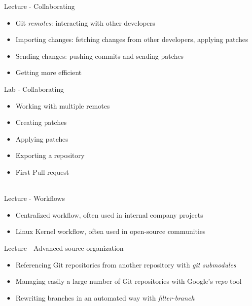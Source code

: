 \documentclass[a4paper,12pt,obeyspaces,spaces,hyphens]{article}
\begin{document}
\feagendatwocolumn
{Lecture - Collaborating}
{
  \begin{itemize}
  \item Git {\em remotes}: interacting with other developers
  \item Importing changes: fetching changes from other developers, applying patches
  \item Sending changes: pushing commits and sending patches
  \item Getting more efficient
  \end{itemize}
}
{Lab - Collaborating}
{
  \begin{itemize}
  \item Working with multiple remotes
  \item Creating patches
  \item Applying patches
  \item Exporting a repository
  \item First Pull request
  \end{itemize}
}
\\
\feagendatwocolumn
{Lecture - Workflows}
{
  \begin{itemize}
  \item Centralized workflow, often used in internal company projects
  \item Linux Kernel workflow, often used in open-source communities
  \end{itemize}
}
{Lecture - Advanced source organization}
{
  \begin{itemize}
  \item Referencing Git repositories from another repository with {\em git submodules}
  \item Managing easily a large number of Git repositories with Google's {\em repo} tool
  \item Rewriting branches in an automated way with {\em filter-branch}
  \end{itemize}
}
\end{document}
